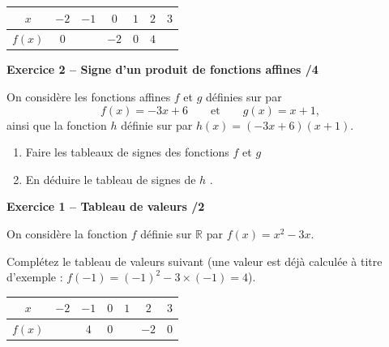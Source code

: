 \documentclass[10pt,a4paper]{article}
\begin{document}
\begin{center}
    \renewcommand{\arraystretch}{1.5}
    \setlength{\tabcolsep}{0.25cm}
    \begin{tabular}{|*{7}{c|}}
    \hline
    \(x\) & \(-2\) & \(-1\) & \(0\) & \(1\) & \(2\) & \(3\) \\
    \hline
    \(f(x)\) & \(0\) & & \(-2\) & \(0\) & \(4\) & \\
    \hline
    \end{tabular}
\end{center}

\textbf{Exercice 2 -- Signe d'un produit de fonctions affines \hfill /4}

On considère les fonctions affines \(f\) et \(g\) définies sur par
\[
f(x)=-3x+6 \qquad\text{et}\qquad g(x)=x+1,
\]
ainsi que la fonction \(h\) définie sur par \(h(x)=(-3x+6)(x+1)\).


\begin{enumerate}
\item Faire les tableaux de signes des fonctions \(f\) et \(g\)

\vspace{6cm}

\item En déduire le tableau de signes de \(h\) .

\vspace{4cm}

\end{enumerate}

\text{ }

\newpage



\textbf{Exercice 1 -- Tableau de valeurs \hfill /2}

On considère la fonction \(f\) définie sur \(\mathbb{R}\) par \(f(x)=x^2-3x\).

Complétez le tableau de valeurs suivant (une valeur est déjà calculée à titre d'exemple : \(f(-1)=(-1)^2-3\times(-1)=4\)).

\begin{center}
    \renewcommand{\arraystretch}{1.5}
    \setlength{\tabcolsep}{0.25cm}
    \begin{tabular}{|*{7}{c|}}
    \hline
    \(x\) & \(-2\) & \(-1\) & \(0\) & \(1\) & \(2\) & \(3\) \\
    \hline
    \(f(x)\) & & \(4\) & \(0\) & & \(-2\) & \(0\) \\
    \hline
    \end{tabular}
\end{center}
\end{document}

